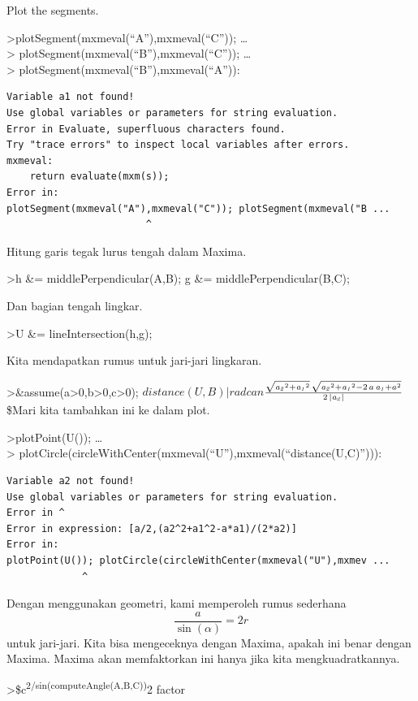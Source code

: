 \documentclass[
]{book}
\begin{document}
Plot the segments.

\textgreater plotSegment(mxmeval(``A''),mxmeval(``C'')); \ldots{}\\
\textgreater{} plotSegment(mxmeval(``B''),mxmeval(``C'')); \ldots{}\\
\textgreater{} plotSegment(mxmeval(``B''),mxmeval(``A'')):

\begin{verbatim}
Variable a1 not found!
Use global variables or parameters for string evaluation.
Error in Evaluate, superfluous characters found.
Try "trace errors" to inspect local variables after errors.
mxmeval:
    return evaluate(mxm(s));
Error in:
plotSegment(mxmeval("A"),mxmeval("C")); plotSegment(mxmeval("B ...
                        ^
\end{verbatim}

Hitung garis tegak lurus tengah dalam Maxima.

\textgreater h \&= middlePerpendicular(A,B); g \&= middlePerpendicular(B,C);

Dan bagian tengah lingkar.

\textgreater U \&= lineIntersection(h,g);

Kita mendapatkan rumus untuk jari-jari lingkaran.

\textgreater\&assume(a\textgreater0,b\textgreater0,c\textgreater0); \(distance(U,B) | radcan\)\(\frac{\sqrt{{\it a_2}^2+{\it a_1}^2}\,\sqrt{{\it a_2}^2+{\it a_1}^2  -2\,a\,{\it a_1}+a^2}}{2\,\left| {\it a_2}\right| }\)\$Mari kita tambahkan ini ke dalam plot.

\textgreater plotPoint(U()); \ldots{}\\
\textgreater{} plotCircle(circleWithCenter(mxmeval(``U''),mxmeval(``distance(U,C)''))):

\begin{verbatim}
Variable a2 not found!
Use global variables or parameters for string evaluation.
Error in ^
Error in expression: [a/2,(a2^2+a1^2-a*a1)/(2*a2)]
Error in:
plotPoint(U()); plotCircle(circleWithCenter(mxmeval("U"),mxmev ...
             ^
\end{verbatim}

Dengan menggunakan geometri, kami memperoleh rumus sederhana \[\frac{a}{\sin(\alpha)}=2r\]untuk jari-jari. Kita bisa mengeceknya dengan Maxima, apakah ini benar dengan Maxima. Maxima akan memfaktorkan ini hanya jika kita mengkuadratkannya.

\textgreater\$c\textsuperscript{2/sin(computeAngle(A,B,C))}2 \textbar{} factor
\end{document}
